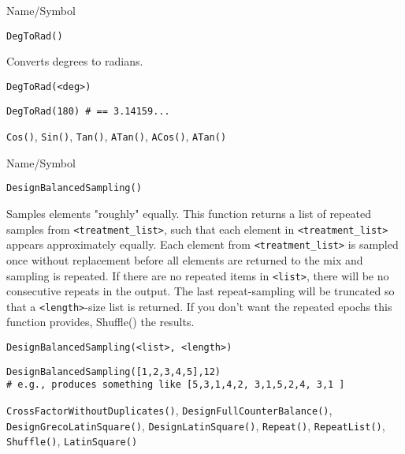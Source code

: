 \begin{desc}{Name/Symbol}
\item[Name/Symbol]  	\verb+DegToRad()+

\item[Description]  	Converts degrees to radians.

\item[Usage]
\begin{verbatim}
DegToRad(<deg>)
\end{verbatim}

\item[Example]     	
\begin{verbatim}
DegToRad(180) # == 3.14159...
\end{verbatim}

\item[See Also]    	\verb+Cos()+, \verb+Sin()+, \verb+Tan()+, \verb+ATan()+, \verb+ACos()+, \verb+ATan()+ 
\end{desc}

\rl



\begin{desc}{Name/Symbol}
\item[Name/Symbol]  	\verb+DesignBalancedSampling()+

\item[Description] 	Samples elements "roughly" equally.
  		This function returns a list of repeated samples from
 		\verb+<treatment_list>+, such that each element in \verb+<treatment_list>+ 
		appears approximately equally.  Each element from 
		\verb+<treatment_list>+ is sampled once without replacement before 
		all elements are returned to the mix and sampling is repeated.  
		If there are no repeated items in \verb+<list>+, there will be no
 		consecutive repeats in the output.  The last repeat-sampling 
		will be truncated so that a \verb+<length>+-size list is returned.  
		If you don't want the repeated epochs this function provides, 
		Shuffle() the results.

\item[Usage]
\begin{verbatim}
DesignBalancedSampling(<list>, <length>)
\end{verbatim}

\item[Example]
\begin{verbatim}
DesignBalancedSampling([1,2,3,4,5],12)
# e.g., produces something like [5,3,1,4,2, 3,1,5,2,4, 3,1 ]
\end{verbatim}

\item[See Also]	\verb+CrossFactorWithoutDuplicates()+, \verb+DesignFullCounterBalance()+,
  		\verb+DesignGrecoLatinSquare()+, \verb+DesignLatinSquare()+, \verb+Repeat()+, 
		\verb+RepeatList()+, \verb+Shuffle()+, \verb+LatinSquare()+

\end{desc}


